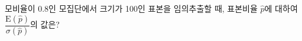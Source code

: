 모비율이 $0.8$인 모집단에서 크기가 100인 표본을 임의추출할 때, 표본비율 $\hat{p}$에 대하여 $\dfrac{\mathrm{E}(\hat{p})}{\sigma(\hat{p})}$의 값은?
